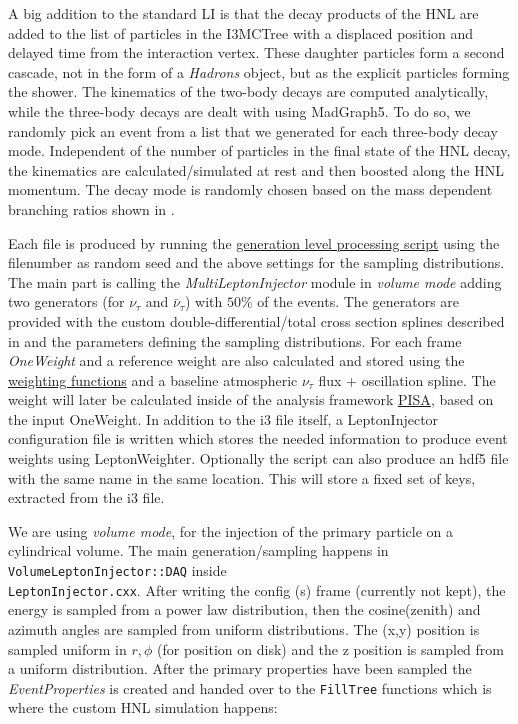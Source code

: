 A big addition to the standard LI is that the decay products of the HNL are added to the list of particles in the I3MCTree with a displaced position and delayed time from the interaction vertex. These daughter particles form a second cascade, not in the form of a \textit{Hadrons} object, but as the explicit particles forming the shower. The kinematics of the two-body decays are computed analytically, while the three-body decays are dealt with using MadGraph5. To do so, we randomly pick an event from a list that we generated for each three-body decay mode. Independent of the number of particles in the final state of the HNL decay, the kinematics are calculated/simulated at rest and then boosted along the HNL momentum. The decay mode is randomly chosen based on the mass dependent branching ratios shown in .

Each file is produced by running the \href{https://github.com/LeanderFischer/I3_HNL_Decay/blob/master/submission_scripts/process/process_Gen.py}{generation level processing script} using the filenumber as random seed and the above settings for the sampling distributions. The main part is calling the \textit{MultiLeptonInjector} module in \textit{volume mode} adding two generators (for $\nu_\tau$ and $\bar{\nu}_\tau$) with $50\%$ of the events. The generators are provided with the custom double-differential/total cross section splines described in  and the parameters defining the sampling distributions. For each frame \textit{OneWeight} and a reference weight are also calculated and stored using the \href{https://github.com/LeanderFischer/LeptonInjector-HNL/blob/main/LeptonInjector/python/hnl_weighting.py}{weighting functions} and a baseline atmospheric $\nu_\tau$ flux + oscillation spline. The weight will later be calculated inside of the analysis framework \href{https://github.com/icecube/pisa}{PISA}, based on the input OneWeight. In addition to the i3 file itself, a LeptonInjector configuration file is written which stores the needed information to produce event weights using LeptonWeighter. Optionally the script can also produce an hdf5 file with the same name in the same location. This will store a fixed set of keys, extracted from the i3 file.

We are using \textit{volume mode}, for the injection of the primary particle on a cylindrical volume. The main generation/sampling happens in \texttt{VolumeLeptonInjector::DAQ} inside \\ \texttt{LeptonInjector.cxx}. After writing the config (s) frame (currently not kept), the energy is sampled from a power law distribution, then the cosine(zenith) and azimuth angles are sampled from uniform distributions. The (x,y) position is sampled uniform in $r, \phi$ (for position on disk) and the z position is sampled from a uniform distribution. After the primary properties have been sampled the \textit{EventProperties} is created and handed over to the \texttt{FillTree} functions which is where the custom HNL simulation happens:

